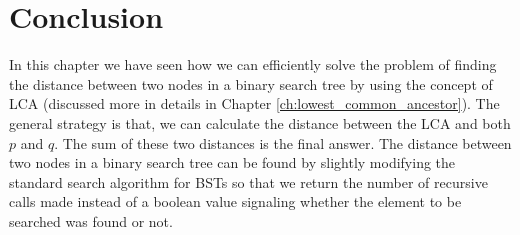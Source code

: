 \section{Conclusion}
In this chapter we have seen how we can efficiently solve the problem of finding the distance between two nodes in a binary search tree
by using the concept of LCA (discussed more in details in Chapter \ref{ch:lowest_common_ancestor}). The general strategy is that,
we can calculate the distance between the LCA and both $p$ and $q$. The sum of these two distances is the final answer.
The distance between two nodes in a binary search tree can be found by slightly modifying the standard search algorithm for BSTs so that we return
the number of recursive calls made instead of a boolean value signaling whether the element to be searched was found or not.